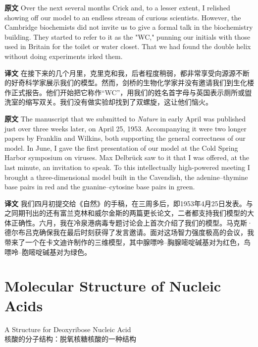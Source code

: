 \documentclass[UTF8,zihao=-4]{ctexart}
\newcommand{\BodyFont}{\fontsize{10.5pt}{15.5pt}\selectfont}
\renewenvironment{quote}{\par\noindent\begingroup\BodyFont}{\par\endgroup}
\begin{document}
\begin{quote}
\noindent\textbf{原文} Over the next several months Crick and, to a lesser extent, I relished showing off our model to an endless stream of curious scientists. However, the Cambridge biochemists did not invite us to give a formal talk in the biochemistry building. They started to refer to it as the "WC," punning our initials with those used in Britain for the toilet or water closet. That we had found the double helix without doing experiments irked them.

\smallskip
\noindent\textbf{译文} 在接下来的几个月里，克里克和我，后者程度稍弱，都非常享受向源源不断的好奇科学家展示我们的模型。然而，剑桥的生物化学家并没有邀请我们到生化楼作正式报告。他们开始把它称作“WC”，用我们的姓名首字母与英国表示厕所或盥洗室的缩写双关。我们没有做实验却找到了双螺旋，这让他们恼火。
\end{quote}

\begin{quote}
\noindent\textbf{原文} The manuscript that we submitted to \emph{Nature} in early April was published just over three weeks later, on April 25, 1953. Accompanying it were two longer papers by Franklin and Wilkins, both supporting the general correctness of our model. In June, I gave the first presentation of our model at the Cold Spring Harbor symposium on viruses. Max Delbrück saw to it that I was offered, at the last minute, an invitation to speak. To this intellectually high-powered meeting I brought a three-dimensional model built in the Cavendish, the adenine--thymine base pairs in red and the guanine--cytosine base pairs in green.

\smallskip
\noindent\textbf{译文} 我们四月初提交给《自然》的手稿，在三周多后，即1953年4月25日发表。与之同期刊出的还有富兰克林和威尔金斯的两篇更长论文，二者都支持我们模型的大体正确性。六月，我在冷泉港病毒专题讨论会上首次介绍了我们的模型。马克斯·德尔布吕克确保我在最后时刻获得了发言邀请。面对这场智力强度极高的会议，我带来了一个在卡文迪许制作的三维模型，其中腺嘌呤--胸腺嘧啶碱基对为红色，鸟嘌呤--胞嘧啶碱基对为绿色。
\end{quote}

\section*{Molecular Structure of Nucleic Acids}
\begin{center}
\large A Structure for Deoxyribose Nucleic Acid\\
\large 核酸的分子结构：脱氧核糖核酸的一种结构
\end{center}
\end{document}
